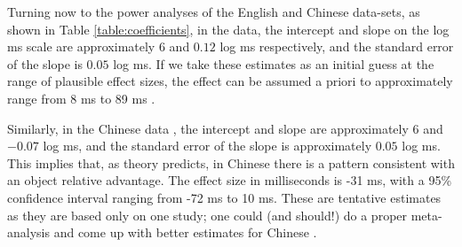 \documentclass{ar-1col}\usepackage[]{graphicx}\usepackage[]{color}
\begin{document}
Turning now to the power analyses of the English and Chinese data-sets, as shown in Table \ref{table:coefficients}, 
in the \citet{grodner} data,  the intercept and slope on the log ms scale are approximately $6$ and $0.12$ log ms respectively, and the standard error of the slope is $0.05$ log ms. If we take these estimates as an initial guess at the range of plausible effect sizes, the effect can be assumed a priori to approximately range from 8 ms to 89 ms \citep[for details on how to obtain these estimates in ms, see][]{NicenboimEtAlBayes2019}.

Similarly, in the Chinese data \citep{gibsonwu}, the intercept and slope are approximately $6$ and $-0.07$ log ms, and the standard error of the slope is approximately $0.05$ log ms. This implies that, as theory predicts, in Chinese there is a pattern consistent with an object relative advantage. The effect size in milliseconds is  -31 ms, with a 95\% confidence interval ranging from 
-72 ms to 10 ms.
These are tentative estimates as they are based only on one study; one could (and should!) do a proper meta-analysis and come up with better estimates for Chinese \citep[for an initial attempt, see][]{VasishthetalPLoSOne2013}. 
\end{document}
